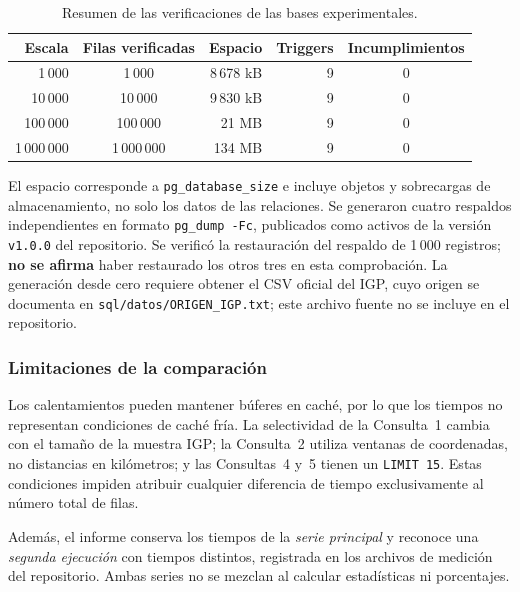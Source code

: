 \documentclass[12pt,a4paper]{article}
\begin{document}
\begin{table}[H]
\centering\small
\begin{tabular}{rcrrc}
\toprule
\textbf{Escala} & \textbf{Filas verificadas} &
\textbf{Espacio} & \textbf{Triggers} & \textbf{Incumplimientos} \\
\midrule
1\,000 & 1\,000 & 8\,678 kB & 9 & 0 \\
10\,000 & 10\,000 & 9\,830 kB & 9 & 0 \\
100\,000 & 100\,000 & 21 MB & 9 & 0 \\
1\,000\,000 & 1\,000\,000 & 134 MB & 9 & 0 \\
\bottomrule
\end{tabular}

\caption{Resumen de las verificaciones de las bases experimentales.}
\label{tab:verificaciones-resumidas-52}
\end{table}

El espacio corresponde a \texttt{pg\_database\_size} e incluye
objetos y sobrecargas de almacenamiento, no solo los datos de las
relaciones. Se generaron cuatro respaldos independientes en
formato \texttt{pg\_dump -Fc}, publicados como activos de la
versión \texttt{v1.0.0} del repositorio. Se verificó la
restauración del respaldo de 1\,000 registros; \textbf{no se
afirma} haber restaurado los otros tres en esta comprobación.
La generación desde cero requiere obtener el CSV oficial del IGP,
cuyo origen se documenta en
\nolinkurl{sql/datos/ORIGEN_IGP.txt}; este archivo fuente no se
incluye en el repositorio.

\subsubsection{Limitaciones de la comparación}

Los calentamientos pueden mantener búferes en caché, por lo que
los tiempos no representan condiciones de caché fría. La
selectividad de la Consulta~1 cambia con el tamaño de la muestra
IGP; la Consulta~2 utiliza ventanas de coordenadas, no distancias
en kilómetros; y las Consultas~4 y~5 tienen un
\texttt{LIMIT 15}. Estas condiciones impiden atribuir cualquier
diferencia de tiempo exclusivamente al número total de filas.

Además, el informe conserva los tiempos de la \emph{serie principal}
y reconoce una \emph{segunda ejecución} con tiempos distintos,
registrada en los archivos de medición del repositorio. Ambas
series no se mezclan al calcular estadísticas ni porcentajes.
\end{document}
